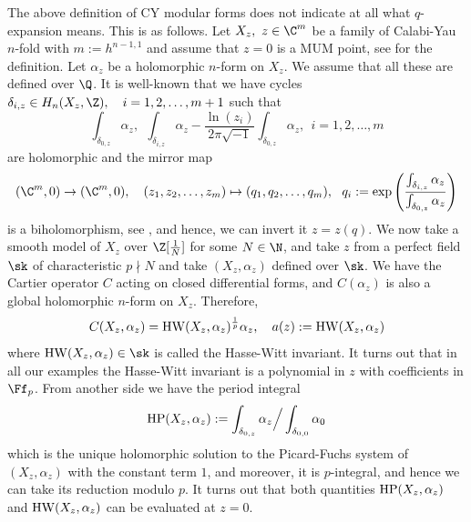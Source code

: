 \documentclass[11pt,leqno]{article}
\theoremstyle{remark}
\theoremstyle{definition}
\begin{document}
The above definition of CY modular forms does not indicate at all what $q$-expansion means. 
This is as follows. Let $X_z,\ z\in \C^m$ be a family of Calabi-Yau $n$-fold with $m:=h^{n-1,1}$ and assume that $z=0$ is a MUM point, see \cite{Morrison1993} for the definition.  Let $\alpha_z$ be a holomorphic $n$-form on $X_z$. We assume that all these are defined over $\Q$. It is well-known that we have cycles $\delta_{i,z}\in H_n(X_z,\Z),\ \ \ i=1,2,\ldots,m+1$ such that 
$$
\int_{\delta_{0,z}}\alpha_z,\ \ \int_{\delta_{i,z}}\alpha_z-\frac{\ln(z_i)}{2\pi\sqrt{-1}}\int_{\delta_{0,z}}\alpha_z,\ \ i=1,2,\ldots,m
$$ 
are holomorphic and the mirror map 
$$
(\C^m,0)\to(\C^m,0),\ \ \ (z_1,z_2,\ldots,z_m)\mapsto (q_1,q_2,\ldots, q_m),\ \ 
q_i:=\exp\left(\frac{\int_{\delta_{i,z}}\alpha_z}{\int_{\delta_{0,z}}\alpha_z}\right)
$$
is a biholomorphism, see \cite{Morrison1993}, and hence, we can invert it $z=z(q)$. We now take a smooth model of $X_z$ over $\Z[\frac{1}{N}]$ for some $N\in\N$, and  take $z$ from a perfect field $\sk$ of characteristic $p\nmid N$ and take $(X_z, \alpha_z)$ defined over $\sk$. We have the Cartier operator $C$ acting on closed differential forms, and $C(\alpha_z)$ is also a global holomorphic $n$-form on $X_z$. Therefore, 
$$
C(X_z, \alpha_z)={\rm HW}(X_z,\alpha_z)^\frac{1}{p}\alpha_z,\ \ \ a(z):={\rm HW}(X_z,\alpha_z)
$$
where ${\rm HW}(X_z,\alpha_z)\in \sk$ is called the Hasse-Witt invariant. It turns out that in all our examples  the Hasse-Witt invariant is a polynomial  in $z$ with coefficients in $\Ff_p$. From another side we have the period integral 
$$
{\rm HP}(X_z,\alpha_z):=
\int_{\delta_{0,z}}\alpha_z\Big / \int_{\delta_{0,0}}\alpha_0
$$
which is the unique holomorphic solution to the Picard-Fuchs system of $(X_z,\alpha_z)$ with the constant term $1$, and moreover, it is $p$-integral, and hence we can take its reduction modulo $p$. It turns out that both quantities ${\rm HP}(X_z,\alpha_z)$ and ${\rm HW}(X_z,\alpha_z)$ can be evaluated at $z=0$.
\end{document}
